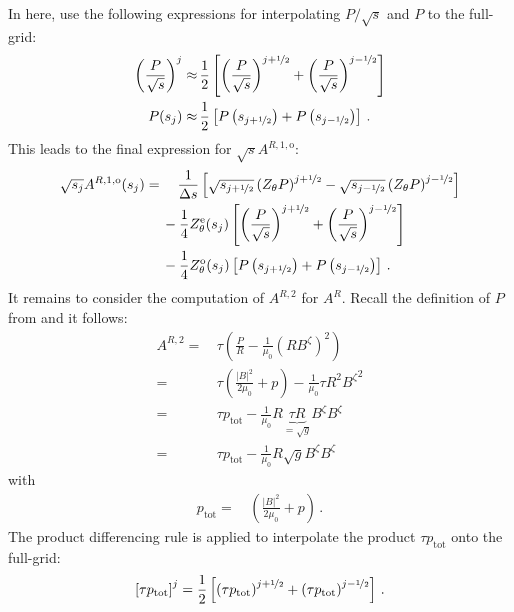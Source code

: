 In here, use the following expressions for interpolating $P/\sqrt{s}$ and $P$ to the full-grid:
\begin{align}
  \left(\frac{P}{\sqrt{s}}\right)^j \approx&\, \frac{1}{2} \left[ \left( \frac{P}{\sqrt{s}} \right)^{j+\nicefrac{1}{2}} + \left( \frac{P}{\sqrt{s}} \right)^{j-\nicefrac{1}{2}} \right] \label{eqn:psqrts_interp} \\
  P(s_j)  \approx&\, \frac{1}{2} \left[ P\left(s_{j+\nicefrac{1}{2}}\right) + P\left(s_{j-\nicefrac{1}{2}}\right) \right] \label{eqn:p_interp} \, .
\end{align}
This leads to the final expression for $\sqrt{s} A^{R,1,\mathrm{o}}$:
\begin{align}
  \sqrt{s_j} A^{R,1,\mathrm{o}}(s_j)
  =&\, \phantom{-}~ \frac{1}{\Delta s} \left[ \sqrt{s_{j+\nicefrac{1}{2}}} \left( Z_\theta P \right)^{j+\nicefrac{1}{2}} - \sqrt{s_{j-\nicefrac{1}{2}}} \left( Z_\theta P \right)^{j-\nicefrac{1}{2}} \right] \nonumber \\
  ~&\,          -   \frac{1}{4} Z_\theta^\mathrm{e}(s_j) \left[ \left( \frac{P}{\sqrt{s}} \right)^{j+\nicefrac{1}{2}} + \left( \frac{P}{\sqrt{s}} \right)^{j-\nicefrac{1}{2}} \right] \nonumber \\
  ~&\,          -   \frac{1}{4} Z_\theta^\mathrm{o}(s_j) \left[ P \left(s_{j+\nicefrac{1}{2}}\right) + P\left(s_{j-\nicefrac{1}{2}}\right) \right] \, .
\end{align}
It remains to consider the computation of $A^{R,2}$ for $A^R$.
Recall the definition of $P$ from  and it follows:
\begin{align}
  A^{R,2}
  =&\, \tau \left( \frac{P}{R} - \frac{1}{\mu_0} \left( R B^\zeta \right)^2 \right) \nonumber \\
  =&\, \tau \left( \frac{|B|^2}{2 \mu_0} + p \right) - \frac{1}{\mu_0} \tau R^2 {B^\zeta}^2 \nonumber \\
  =&\, \tau p_\mathrm{tot} - \frac{1}{\mu_0} R \underbrace{\tau R}_{=\sqrt{g}} B^\zeta B^\zeta \nonumber \\
  =&\, \tau p_\mathrm{tot} - \frac{1}{\mu_0} R \sqrt{g} B^\zeta B^\zeta
\end{align}
with
\begin{align}
  p_\mathrm{tot} =&\, \left( \frac{|B|^2}{2 \mu_0} + p \right) \, .
\end{align}
The product differencing rule is applied to interpolate the product $\tau p_\mathrm{tot}$ onto the full-grid:
\begin{equation}
  \left[ \tau p_\mathrm{tot} \right]^j = \frac{1}{2} \left[ \left( \tau p_\mathrm{tot} \right)^{j+\nicefrac{1}{2}} + \left( \tau p_\mathrm{tot} \right)^{j-\nicefrac{1}{2}} \right] \, .
\end{equation}
